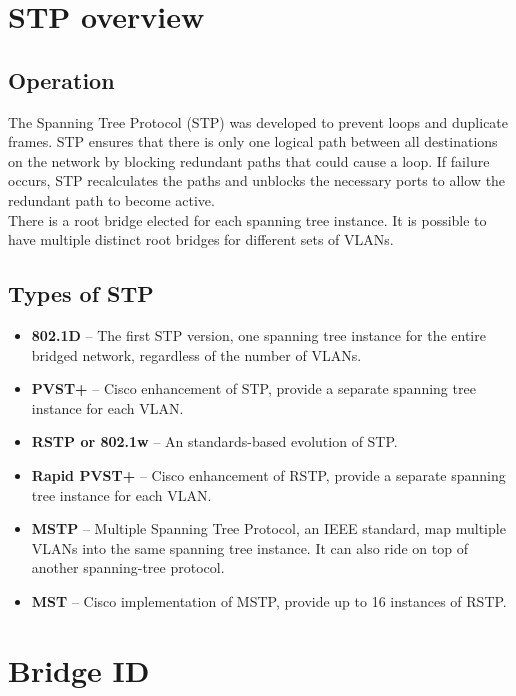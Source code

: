 \section{STP overview}

\subsection{Operation}

The Spanning Tree Protocol (STP) was developed to prevent loops and duplicate frames. STP ensures that there is only one logical path between all destinations on the network by blocking redundant paths that could cause a loop. If failure occurs, STP recalculates the paths and unblocks the necessary ports to allow the redundant path to become active.\\

There is a root bridge elected for each spanning tree instance. It is possible to have multiple distinct root bridges for different sets of VLANs.\\

\subsection{Types of STP}

\begin{itemize}
\item \textbf{802.1D} -- The first STP version, one spanning tree instance for the entire bridged network, regardless of the number of VLANs.
\item \textbf{PVST+} -- Cisco enhancement of STP, provide a separate spanning tree instance for each VLAN.
\item \textbf{RSTP or 802.1w} -- An standards-based evolution of STP.
\item \textbf{Rapid PVST+} -- Cisco enhancement of RSTP, provide a separate spanning tree instance for each VLAN.
\item \textbf{MSTP} -- Multiple Spanning Tree Protocol, an IEEE standard, map multiple VLANs into the same spanning tree instance. It can also ride on top of another spanning-tree protocol.
\item \textbf{MST} -- Cisco implementation of MSTP, provide up to 16 instances of RSTP.
\end{itemize}

\section{Bridge ID}

